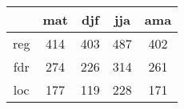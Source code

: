 \begin{tabular}{c|cccc}
& mat & djf & jja & ama \\
\hline
reg & 414 & 403 & 487 & 402 \\
fdr & 274 & 226 & 314 & 261 \\
loc & 177 & 119 & 228 & 171 \\
\end{tabular}
